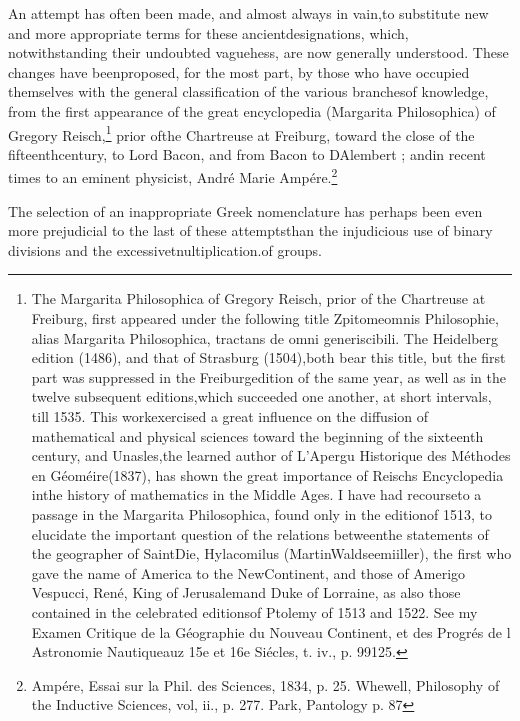 An attempt has often been made, and almost always in vain,to substitute new and more appropriate terms for these ancientdesignations, which, notwithstanding their undoubted vaguehess, are now generally understood. These changes have beenproposed, for the most part, by those who have occupied themselves with the general classification of the various branchesof knowledge, from the first appearance of the great encyclopedia (Margarita Philosophica) of Gregory Reisch,\footnote{The Margarita Philosophica of Gregory Reisch, prior of the Chartreuse at Freiburg, first appeared under the following title Zpitomeomnis Philosophie, alias Margarita Philosophica, tractans de omni generiscibili. The Heidelberg edition (1486), and that of Strasburg (1504),both bear this title, but the first part was suppressed in the Freiburgedition of the same year, as well as in the twelve subsequent editions,which succeeded one another, at short intervals, till 1535. This workexercised a great influence on the diffusion of mathematical and physical sciences toward the beginning of the sixteenth century, and Unasles,the learned author of L'Apergu Historique des M\'{e}thodes en G\'{e}om\'{e}ire(1837), has shown the great importance of Reischs Encyclopedia inthe history of mathematics in the Middle Ages. I have had recourseto a passage in the Margarita Philosophica, found only in the editionof 1513, to elucidate the important question of the relations betweenthe statements of the geographer of SaintDie, Hylacomilus (MartinWaldseemiiller), the first who gave the name of America to the NewContinent, and those of Amerigo Vespucci, Ren\'{e}, King of Jerusalemand Duke of Lorraine, as also those contained in the celebrated editionsof Ptolemy of 1513 and 1522. See my Examen Critique de la G\'{e}ographie du Nouveau Continent, et des Progr\'{e}s de l Astronomie Nautiqueauz 15e et 16e Si\'{e}cles, t. iv., p. 99125.} prior ofthe Chartreuse at Freiburg, toward the close of the fifteenthcentury, to Lord Bacon, and from Bacon to DAlembert ; andin recent times to an eminent physicist, Andr\'{e} Marie Amp\'{e}re.\footnote{Amp\'{e}re, Essai sur la Phil. des Sciences, 1834, p. 25. Whewell, Philosophy of the Inductive Sciences, vol, ii., p. 277. Park, Pantology p. 87}

The selection of an inappropriate Greek nomenclature has perhaps been even more prejudicial to the last of these attemptsthan the injudicious use of binary divisions and the excessivetnultiplication.of groups.

